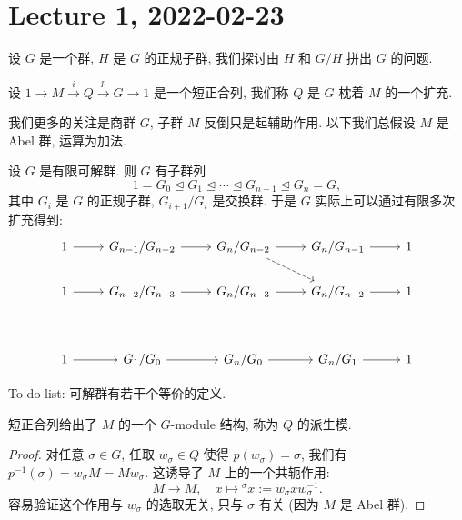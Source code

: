 \section{Lecture 1, 2022-02-23}
\label{sec:lecture1}

设 $G$ 是一个群, $H$ 是 $G$ 的正规子群,
我们探讨由 $H$ 和 $G/H$ 拼出 $G$ 的问题.

\begin{defin}
设 $1 \xrightarrow{} M \xrightarrow{i} Q \xrightarrow{p} G \xrightarrow{} 1$
是一个短正合列, 我们称 $Q$ 是 $G$ 枕着 $M$ 的一个扩充.
\end{defin}

我们更多的关注是商群 $G$, 子群 $M$ 反倒只是起辅助作用.
以下我们总假设 $M$ 是 Abel 群, 运算为加法.

\begin{exmp}
设 $G$ 是有限可解群. 则 $G$ 有子群列
\[
1 = G_0 \unlhd G_1 \unlhd \cdots \unlhd G_{n-1} \unlhd G_n = G,
\]
其中 $G_i$ 是 $G$ 的正规子群, $G_{i+1}/G_i$ 是交换群.
于是 $G$ 实际上可以通过有限多次扩充得到:
\[
\begin{tikzcd}
	1 & {G_{n-1}/G_{n-2}} & {G_n/G_{n-2}} & {G_n/G_{n-1}} & 1 \\
	1 & {G_{n-2}/G_{n-3}} & {G_n/G_{n-3}} & {G_n/G_{n-2}} & 1 \\
	\\
	1 & {G_1/G_0} & {G_n/G_0} & {G_n/G_1} & 1
	\arrow[from=1-1, to=1-2]
	\arrow[from=1-2, to=1-3]
	\arrow[from=1-3, to=1-4]
	\arrow[from=1-4, to=1-5]
	\arrow[from=2-1, to=2-2]
	\arrow[from=2-2, to=2-3]
	\arrow[from=2-3, to=2-4]
	\arrow[from=2-4, to=2-5]
	\arrow[from=4-1, to=4-2]
	\arrow[from=4-2, to=4-3]
	\arrow[from=4-3, to=4-4]
	\arrow[from=4-4, to=4-5]
	\arrow[dashed, from=1-3, to=2-4]
\end{tikzcd}
\]
\end{exmp}

\begin{rem*}
To do list: 可解群有若干个等价的定义.
\end{rem*}

\begin{lem}
短正合列给出了 $M$ 的一个 $G$-module 结构, 称为 $Q$ 的派生模.
\end{lem}

\begin{proof}
对任意 $\sigma \in G$, 任取 $w_\sigma \in Q$ 使得 $p(w_\sigma) = \sigma$,
我们有 $p^{-1}(\sigma) = w_\sigma M = Mw_\sigma$.
这诱导了 $M$ 上的一个共轭作用:
\begin{equation}
M \to M, \quad x \mapsto {}^\sigma x := w_\sigma x w_\sigma^{-1}.
\end{equation}
容易验证这个作用与 $w_\sigma$ 的选取无关, 只与 $\sigma$ 有关
(因为 $M$ 是 Abel 群).
\end{proof}

